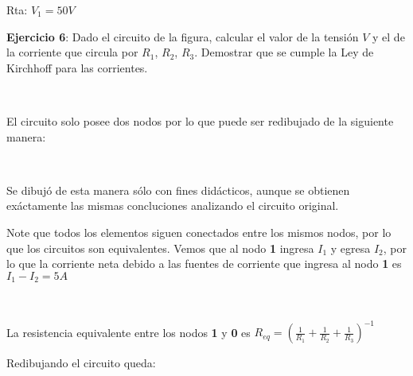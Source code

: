 \documentclass[11pt]{article}
\begin{document}
    Rta: \(V_1=50V\)

\textbf{Ejercicio 6}: Dado el circuito de la figura, calcular el valor
de la tensión \(V\) y el de la corriente que circula por \(R_1\),
\(R_2\), \(R_3\). Demostrar que se cumple la Ley de Kirchhoff para las
corrientes.

    \begin{center}
    \end{center}
    { \hspace*{\fill} \\}
    
    El circuito solo posee dos nodos por lo que puede ser redibujado de la
siguiente manera:

    \begin{center}
    \end{center}
    { \hspace*{\fill} \\}
    
    Se dibujó de esta manera sólo con fines didácticos, aunque se obtienen
exáctamente las mismas concluciones analizando el circuito original.

Note que todos los elementos siguen conectados entre los mismos nodos,
por lo que los circuitos son equivalentes. Vemos que al nodo \textbf{1}
ingresa \(I_1\) y egresa \(I_2\), por lo que la corriente neta debido a
las fuentes de corriente que ingresa al nodo \textbf{1} es
\(I_1-I_2=5A\)

    \begin{center}
    \end{center}
    { \hspace*{\fill} \\}
    
    La resistencia equivalente entre los nodos \textbf{1} y \textbf{0} es
\(R_{eq}= \left( \frac{1}{R_1}+\frac{1}{R_2}+\frac{1}{R_3} \right) ^{-1}\)

    Redibujando el circuito queda:

    \begin{center}
    \end{center}
    { \hspace*{\fill} \\}
    
\end{document}
